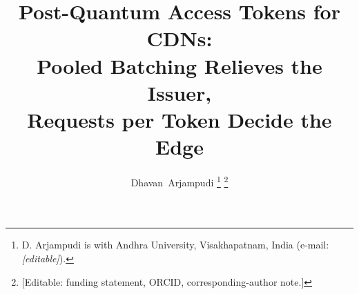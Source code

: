 \documentclass[journal]{IEEEtran}
\theoremstyle{remark}
\begin{document}
\title{Post-Quantum Access Tokens for CDNs:\\ Pooled Batching Relieves the Issuer,\\ Requests per Token Decide the Edge}

\author{Dhavan~Arjampudi%
\thanks{D. Arjampudi is with Andhra University, Visakhapatnam, India (e-mail: \emph{[editable]}).}%
\thanks{[Editable: funding statement, ORCID, corresponding-author note.]}}


\maketitle











\FloatBarrier
\appendices

\FloatBarrier



\end{document}
